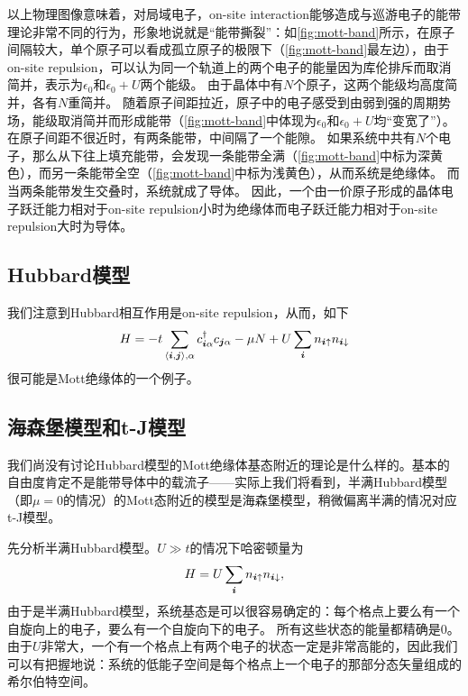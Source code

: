 以上物理图像意味着，对局域电子，on-site interaction能够造成与巡游电子的能带理论非常不同的行为，形象地说就是“能带撕裂”：如\autoref{fig:mott-band}所示，在原子间隔较大，单个原子可以看成孤立原子的极限下（\autoref{fig:mott-band}最左边），由于on-site repulsion，可以认为同一个轨道上的两个电子的能量因为库伦排斥而取消简并，表示为$\epsilon_0$和$\epsilon_0 + U$两个能级。
由于晶体中有$N$个原子，这两个能级均高度简并，各有$N$重简并。
随着原子间距拉近，原子中的电子感受到由弱到强的周期势场，能级取消简并而形成能带（\autoref{fig:mott-band}中体现为$\epsilon_0$和$\epsilon_0 + U$均“变宽了”）。
在原子间距不很近时，有两条能带，中间隔了一个能隙。
如果系统中共有$N$个电子，那么从下往上填充能带，会发现一条能带全满（\autoref{fig:mott-band}中标为深黄色），而另一条能带全空（\autoref{fig:mott-band}中标为浅黄色），从而系统是绝缘体。
而当两条能带发生交叠时，系统就成了导体。
因此，一个由一价原子形成的晶体电子跃迁能力相对于on-site repulsion小时为绝缘体而电子跃迁能力相对于on-site repulsion大时为导体。

\subsection{Hubbard模型}

我们注意到Hubbard相互作用是on-site repulsion，从而，如下
\begin{equation}
    H = - t \sum_{\langle \vb*{i}, \vb*{j} \rangle, \alpha} c^\dagger_{\vb*{i} \alpha} c_{\vb*{j} \alpha} - \mu N + U \sum_{\vb*{i}} n_{\vb*{i} \uparrow} n_{\vb*{i} \downarrow}
\end{equation}
很可能是Mott绝缘体的一个例子。



\subsection{海森堡模型和t-J模型}

我们尚没有讨论Hubbard模型的Mott绝缘体基态附近的理论是什么样的。基本的自由度肯定不是能带导体中的载流子——实际上我们将看到，半满Hubbard模型（即$\mu=0$的情况）的Mott态附近的模型是海森堡模型，稍微偏离半满的情况对应t-J模型。

先分析半满Hubbard模型。$U \gg t$的情况下哈密顿量为
\[
    H = U \sum_{\vb*{i}} n_{\vb*{i} \uparrow} n_{\vb*{i} \downarrow},
\]
由于是半满Hubbard模型，系统基态是可以很容易确定的：每个格点上要么有一个自旋向上的电子，要么有一个自旋向下的电子。
所有这些状态的能量都精确是$0$。由于$U$非常大，一个有一个格点上有两个电子的状态一定是非常高能的，因此我们可以有把握地说：系统的低能子空间是每个格点上一个电子的那部分态矢量组成的希尔伯特空间。

